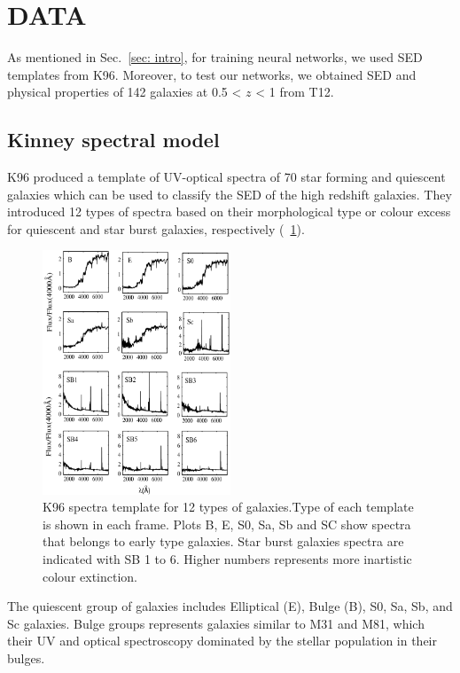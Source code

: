 
\section{DATA}
\label{sec: data}
As mentioned in Sec.~\ref{sec: intro}, for training neural networks, we used SED templates from K96.
Moreover, to test our networks, we obtained SED and physical properties of 142 galaxies at 0.5 < $z$ < 1 from T12.
 \subsection{Kinney spectral model}
    K96 produced a template of UV-optical spectra of 70 star forming and quiescent galaxies which can be used to classify the SED of the high redshift galaxies.
    They introduced 12 types of spectra based on their morphological type or colour excess for quiescent and star burst galaxies, respectively (~\ref{fig: k96}).
    \begin{figure}
        \centering
        \includegraphics[width=0.5\textwidth]{../images/k96.jpg}
        \caption{K96 spectra template for 12 types of galaxies.Type of each template is shown in each frame. Plots B, E, S0, Sa, Sb and SC show spectra that belongs to early type galaxies. Star burst galaxies spectra are indicated with SB 1 to 6. Higher numbers represents more inartistic colour extinction.}
        \label{fig: k96}
    \end{figure}
    The quiescent group of galaxies includes Elliptical (E), Bulge (B), S0, Sa, Sb, and Sc galaxies.
    Bulge groups represents galaxies similar to M31 and M81, which their UV and optical spectroscopy dominated by the stellar population in their bulges.
    
